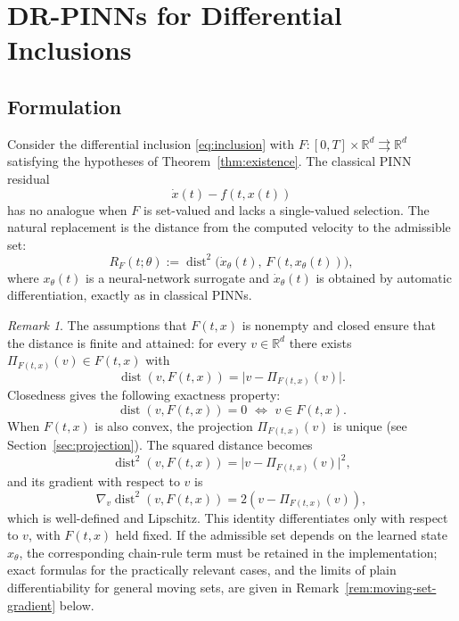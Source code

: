 \documentclass[11pt]{elsarticle}
\theoremstyle{definition}
\theoremstyle{remark}
\newtheorem{remark}[theorem]{Remark}
\numberwithin{equation}{section}
\def\dist{\operatorname{dist}}
\begin{document}
	
	\section{DR-PINNs for Differential Inclusions}
	\label{sec:distance-residual}
	
	\subsection{Formulation}
	\label{sec:description-formulation}
	
	Consider the differential inclusion \eqref{eq:inclusion} with $F:[0,T]\times\mathbb{R}^d\rightrightarrows\mathbb{R}^d$ satisfying
	the hypotheses of Theorem~\ref{thm:existence}.  The classical PINN
	residual
	\[
	\dot{x}(t)-f(t,x(t))
	\]
	has no analogue when $F$ is set-valued and lacks a single-valued
	selection.  The natural replacement is the distance from the computed
	velocity to the admissible set:
	\begin{equation}\label{eq:inclusion-residual}
		R_F(t;\theta)
		:=
		\dist^2\bigl(\dot{x}_\theta(t),\,F(t,x_\theta(t))\bigr),
	\end{equation}
	where $x_\theta(t)$ is a neural-network surrogate and $\dot{x}_\theta(t)$
	is obtained by automatic differentiation, exactly as in classical PINNs.
	
	\begin{remark}
		The assumptions that $F(t,x)$ is nonempty and closed ensure that the
		distance is finite and attained: for every $v\in\mathbb{R}^d$ there
		exists $\Pi_{F(t,x)}(v)\in F(t,x)$ with
		\[
		\dist(v,F(t,x))=\bigl|v-\Pi_{F(t,x)}(v)\bigr|.
		\]
		Closedness gives the following exactness property:
		\[
		\dist(v,F(t,x))=0 \,\,\iff\,\, v\in F(t,x).
		\]
		When $F(t,x)$ is also convex,
		the projection $\Pi_{F(t,x)}(v)$ is unique (see Section~\ref{sec:projection}).
		The squared distance becomes
		\begin{equation}\label{loss:distance}
			\dist^2(v,F(t,x))=\bigl|v-\Pi_{F(t,x)}(v)\bigr|^2,
		\end{equation}
		and its gradient with respect to $v$ is
		\[
		\nabla_v\dist^2(v,F(t,x))=2(v-\Pi_{F(t,x)}(v)),
		\]
		which is well-defined and Lipschitz. This identity differentiates
		only with respect to $v$, with $F(t,x)$ held fixed. If the admissible
		set depends on the learned state $x_\theta$, the corresponding
		chain-rule term must be retained in the implementation; exact
		formulas for the practically relevant cases, and the limits of plain
		differentiability for general moving sets, are given in
		Remark~\ref{rem:moving-set-gradient} below.
	\end{remark}
	
\end{document}
